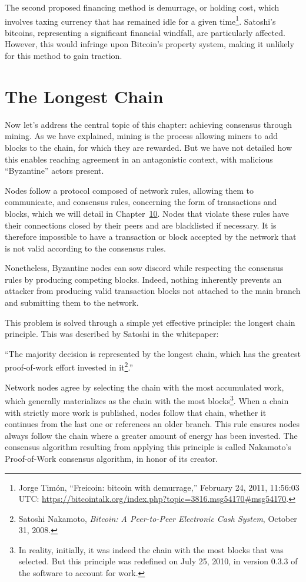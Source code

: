 \documentclass[
  a5paper,
  smalldemyvopaper,10pt,twoside,onecolumn,openright,extrafontsizes,hidelinks]{memoir}
\begin{document}
The second proposed financing method is demurrage, or holding cost,
which involves taxing currency that has remained idle for a given
time\footnote{Jorge Timón, ``Freicoin: bitcoin with demurrage,''
  February 24, 2011, 11:56:03 UTC:
  \url{https://bitcointalk.org/index.php?topic=3816.msg54170\#msg54170}.}.
Satoshi's bitcoins, representing a significant financial windfall, are
particularly affected. However, this would infringe upon Bitcoin's
property system, making it unlikely for this method to gain traction.

\section*{The Longest Chain}\label{la-chauxeene-la-plus-longue}


Now let's address the central topic of this chapter: achieving consensus
through mining. As we have explained, mining is the process allowing
miners to add blocks to the chain, for which they are rewarded. But we
have not detailed how this enables reaching agreement in an antagonistic
context, with malicious ``Byzantine'' actors present.

Nodes follow a protocol composed of network rules, allowing them to
communicate, and consensus rules, concerning the form of transactions
and blocks, which we will detail in
Chapter~\hyperref[ch:changement]{10}. Nodes that violate these rules
have their connections closed by their peers and are blacklisted if
necessary. It is therefore impossible to have a transaction or block
accepted by the network that is not valid according to the consensus
rules.

Nonetheless, Byzantine nodes can sow discord while respecting the
consensus rules by producing competing blocks. Indeed, nothing
inherently prevents an attacker from producing valid transaction blocks
not attached to the main branch and submitting them to the network.

This problem is solved through a simple yet effective principle: the
longest chain principle. This was described by Satoshi in the
whitepaper:

``The majority decision is represented by the longest chain, which has
the greatest proof-of-work effort invested in it\footnote{Satoshi
  Nakamoto, \emph{Bitcoin: A Peer-to-Peer Electronic Cash System},
  October 31, 2008.}.''

Network nodes agree by selecting the chain with the most accumulated
work, which generally materializes as the chain with the most
blocks\footnote{In reality, initially, it was indeed the chain with the
  most blocks that was selected. But this principle was redefined on
  July 25, 2010, in version 0.3.3 of the software to account for work.}.
When a chain with strictly more work is published, nodes follow that
chain, whether it continues from the last one or references an older
branch. This rule ensures nodes always follow the chain where a greater
amount of energy has been invested. The consensus algorithm resulting
from applying this principle is called Nakamoto's Proof-of-Work
consensus algorithm, in honor of its creator.
\end{document}
